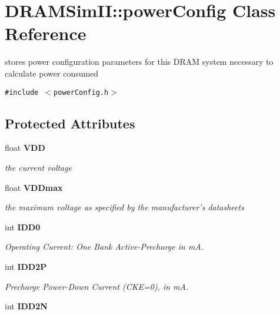 \section{DRAMSimII::powerConfig Class Reference}
\label{class_d_r_a_m_sim_i_i_1_1power_config}
stores power configuration parameters for this DRAM system necessary to calculate power consumed  


{\tt \#include $<$powerConfig.h$>$}

\subsection*{Protected Attributes}
\begin{CompactItemize}
\item 
float {\bf VDD}\label{class_d_r_a_m_sim_i_i_1_1power_config_433ca6e2272af43b62095c7971353340}

\begin{CompactList}\small\item\em the current voltage \item\end{CompactList}\item 
float {\bf VDDmax}\label{class_d_r_a_m_sim_i_i_1_1power_config_98828aef2c6ca9ae7f3339f3f4529e9e}

\begin{CompactList}\small\item\em the maximum voltage as specified by the manufacturer's datasheets \item\end{CompactList}\item 
int {\bf IDD0}\label{class_d_r_a_m_sim_i_i_1_1power_config_e91778aee97a5655b472fa2201ffd125}

\begin{CompactList}\small\item\em Operating Current: One Bank Active-Precharge in mA. \item\end{CompactList}\item 
int {\bf IDD2P}\label{class_d_r_a_m_sim_i_i_1_1power_config_090eecdc0cc0a7bd0a6ca5ccec15f2a3}

\begin{CompactList}\small\item\em Precharge Power-Down Current (CKE=0), in mA. \item\end{CompactList}\item 
int {\bf IDD2N}\label{class_d_r_a_m_sim_i_i_1_1power_config_90a01ad954886dca067db2c8c2afd6ab}


\end{CompactItemize}
